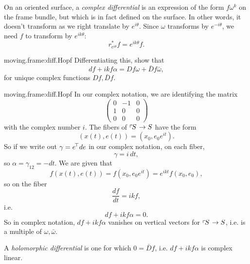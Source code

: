 %
On an oriented surface, a \emph{complex differential} is an expression of the form \(f\omega^k\) on the frame bundle, but which is in fact defined on the surface.
In other words, it doesn't transform as we right translate by \(e^{i\theta}\).
Since \(\omega\) transforms by \(e^{-i\theta}\), we need \(f\) to transform by \(e^{ik\theta}\):
\[
r_{e^{i\theta}}^*f=e^{ik\theta}f.
\]
\begin{problem}{moving.frame:diff.Hopf}
Differentiating this, show that
\[
df+ikf\alpha=Df \omega + \bar{D}f \bar\omega,
\]  
for unique complex functions \(Df,\bar{D}f\).
\end{problem}
\begin{answer}{moving.frame:diff.Hopf}
In our complex notation, we are identifying the matrix
\[
\begin{pmatrix}
0 & -1 & 0 \\
1 &  0 & 0 \\
0 & 0 & 0
\end{pmatrix}
\]
with the complex number \(i\).
The fibers of \(\left\ulcorner\!S\right. \to S\) have the form
\[
(x(t),e(t))=(x_0,e_0e^{it}).
\]
So if we write out \(\gamma=e^{\!\top}de\) in our complex notation,
on each fiber,
\[
\gamma=i \, dt,
\]
so \(\alpha=\gamma_{12}=-dt\).
We are given that
\[
f(x(t),e(t))=f(x_0,e_0e^{it})=e^{ikt}f(x_0,e_0),
\]
so on the fiber
\[
\frac{df}{dt}=ikf,
\]
i.e.
\[
df+ikf\alpha=0.
\]
So in complex notation, \(df+ikf\alpha\) vanishes on vertical vectors for \(\left\ulcorner\!S\right. \to S\), i.e. is a multiple of \(\omega,\bar\omega\).
\end{answer}
A \emph{holomorphic differential} is one for which \(0=\bar{D}f\), i.e. \(df+ikf\alpha\) is complex linear.

